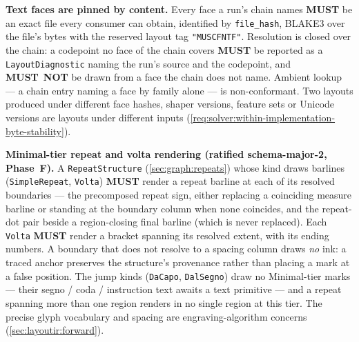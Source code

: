 \documentclass[11pt,letterpaper]{report}
\newcounter{requirement}[chapter]
\newcommand{\MUST}{\textbf{MUST}}
\newcommand{\MUSTNOT}{\textbf{MUST}\nobreak\ \textbf{NOT}}
\begin{document}
\begin{requirement}
  \label{req:layoutir:text-faces}
  \textbf{Text faces are pinned by content.} Every face a run's chain
  names \MUST{} be an exact file every consumer can obtain, identified by
  \texttt{file\_hash}, BLAKE3 over the file's bytes with the reserved
  layout tag \texttt{"MUSCFNTF"}. Resolution is closed over the chain: a
  codepoint no face of the chain covers \MUST{} be reported as a
  \texttt{LayoutDiagnostic} naming the run's source and the codepoint,
  and \MUSTNOT{} be drawn from a face the chain does not name. Ambient
  lookup --- a chain entry naming a face by family alone --- is
  non-conformant. Two layouts produced under different face hashes,
  shaper versions, feature sets or Unicode versions are layouts under
  different inputs (\ref{req:solver:within-implementation-byte-stability}).
\end{requirement}

\begin{requirement}
  \label{req:layoutir:repeat-render}
  \textbf{Minimal-tier repeat and volta rendering (ratified
  schema-major-2, Phase~F).} A \texttt{RepeatStructure}
  (\ref{sec:graph:repeats}) whose kind draws barlines
  (\texttt{SimpleRepeat}, \texttt{Volta}) \MUST{} render a repeat
  barline at each of its resolved boundaries --- the precomposed
  repeat sign, either replacing a coinciding measure barline or
  standing at the boundary column when none coincides, and the
  repeat-dot pair beside a region-closing final barline (which is
  never replaced). Each \texttt{Volta} \MUST{} render a bracket
  spanning its resolved extent, with its ending numbers. A boundary
  that does not resolve to a spacing column draws \emph{no} ink: a
  traced anchor preserves the structure's provenance rather than
  placing a mark at a false position. The jump kinds
  (\texttt{DaCapo}, \texttt{DalSegno}) draw no Minimal-tier marks ---
  their segno / coda / instruction text awaits a text primitive ---
  and a repeat spanning more than one region renders in no single
  region at this tier. The precise glyph vocabulary and spacing are
  engraving-algorithm concerns (\ref{sec:layoutir:forward}).
\end{requirement}
\end{document}
